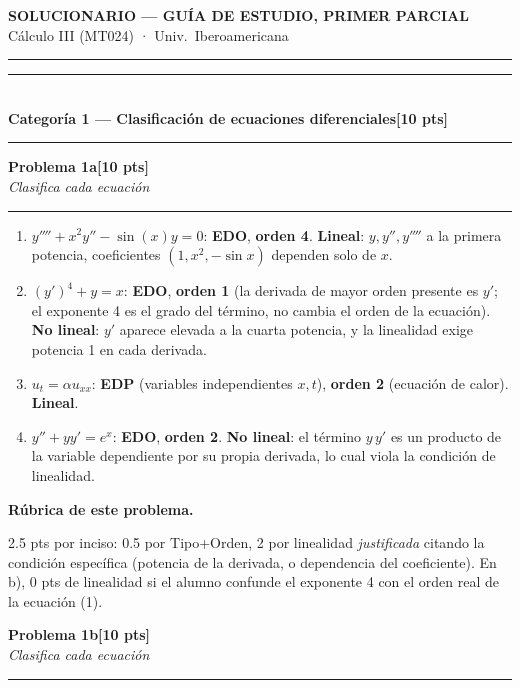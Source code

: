 \documentclass[11pt,letterpaper]{article}
\newcommand{\categoria}[3]{%
  \bigskip\bigskip\noindent
  \rule{\linewidth}{0.8pt}\\[2pt]
  {\Large\bfseries Categoría #1 --- #2}\hfill\textbf{[#3 pts]}\\[2pt]
  \rule{\linewidth}{0.8pt}\vspace{4pt}
}
\newcommand{\problema}[3]{%
  \bigskip\noindent
  {\large\textbf{Problema #1}}\hfill\textbf{[#2 pts]}\\[3pt]
  {\small\itshape #3}\par
  \vspace{2pt}\hrule\vspace{8pt}
}
\newenvironment{rubrica}{%
  \begin{mdframed}[linecolor=black,linewidth=0.6pt,
    innerleftmargin=8pt,innerrightmargin=8pt,innertopmargin=5pt,innerbottommargin=5pt]
  \small\textbf{Rúbrica de este problema.}\par\smallskip
}{\end{mdframed}}
\begin{document}
\begin{center}
{\Large\bfseries SOLUCIONARIO — GUÍA DE ESTUDIO, PRIMER PARCIAL}\\[2pt]
{\small Cálculo III (MT024) · Univ.\ Iberoamericana}
\end{center}

\vspace{4pt}\hrule

\categoria{1}{Clasificación de ecuaciones diferenciales}{10}

\problema{1a}{10}{Clasifica cada ecuación}

\begin{enumerate}[label=\textbf{\alph*)}, itemsep=8pt]
  \item $y''''+x^2y''-\sin(x)y=0$: \textbf{EDO}, \textbf{orden 4}. \textbf{Lineal}: $y,y'',y''''$ a la primera potencia, coeficientes $(1,x^2,-\sin x)$ dependen solo de $x$.
  \item $(y')^4+y=x$: \textbf{EDO}, \textbf{orden 1} (la derivada de mayor orden presente es $y'$; el exponente 4 es el grado del término, no cambia el orden de la ecuación). \textbf{No lineal}: $y'$ aparece elevada a la cuarta potencia, y la linealidad exige potencia 1 en cada derivada.
  \item $u_t = \alpha u_{xx}$: \textbf{EDP} (variables independientes $x,t$), \textbf{orden 2} (ecuación de calor). \textbf{Lineal}.
  \item $y''+yy'=e^x$: \textbf{EDO}, \textbf{orden 2}. \textbf{No lineal}: el término $y\,y'$ es un producto de la variable dependiente por su propia derivada, lo cual viola la condición de linealidad.
\end{enumerate}

\begin{rubrica}
2.5 pts por inciso: 0.5 por Tipo+Orden, 2 por linealidad \emph{justificada} citando la condición específica (potencia de la derivada, o dependencia del coeficiente). En b), 0 pts de linealidad si el alumno confunde el exponente 4 con el orden real de la ecuación (1).
\end{rubrica}

\problema{1b}{10}{Clasifica cada ecuación}
\end{document}
